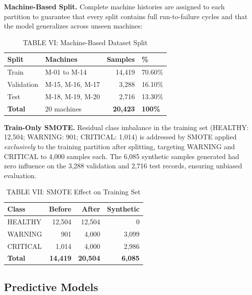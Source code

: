 \documentclass[conference]{IEEEtran}
\begin{document}
\textbf{Machine-Based Split.} Complete machine histories are assigned to
each partition to guarantee that every split contains full run-to-failure
cycles and that the model generalizes across unseen machines:

\begin{table}[htbp]
\caption{TABLE VI: Machine-Based Dataset Split}
\centering
\begin{tabular}{llrl}
\hline
\textbf{Split} & \textbf{Machines} & \textbf{Samples} & \textbf{\%} \\
\hline
Train      & M-01 to M-14      & 14,419 & 70.60\% \\
Validation & M-15, M-16, M-17  &  3,288 & 16.10\% \\
Test       & M-18, M-19, M-20  &  2,716 & 13.30\% \\
\hline
\textbf{Total} & 20 machines & \textbf{20,423} & \textbf{100\%} \\
\hline
\end{tabular}
\label{tab:split}
\end{table}

\textbf{Train-Only SMOTE.} Residual class imbalance in the training set
(HEALTHY: 12,504; WARNING: 901; CRITICAL: 1,014) is addressed by SMOTE
\cite{chawla2002smote} applied \textit{exclusively} to the training partition
after splitting, targeting WARNING and CRITICAL to 4,000 samples each. The
6,085 synthetic samples generated had zero influence on the 3,288 validation
and 2,716 test records, ensuring unbiased evaluation.

\begin{table}[htbp]
\caption{TABLE VII: SMOTE Effect on Training Set}
\centering
\begin{tabular}{lrrr}
\hline
\textbf{Class} & \textbf{Before} & \textbf{After} & \textbf{Synthetic} \\
\hline
HEALTHY  & 12,504 & 12,504 &     0 \\
WARNING  &    901 &  4,000 & 3,099 \\
CRITICAL &  1,014 &  4,000 & 2,986 \\
\hline
\textbf{Total} & \textbf{14,419} & \textbf{20,504} & \textbf{6,085} \\
\hline
\end{tabular}
\label{tab:smote}
\end{table}

\subsection{Predictive Models}
\end{document}
